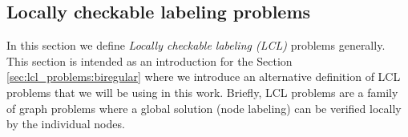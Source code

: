 
\subsection{Locally checkable labeling problems} \label{sec:lcl_problems}
In this section we define \emph{Locally checkable labeling (LCL)} problems generally.
This section is intended as an introduction for the Section \ref{sec:lcl_problems:biregular} where we introduce an alternative definition of LCL problems that we will be using in this work.
Briefly, LCL problems are a family of graph problems where a global solution (node labeling) can be verified locally by the individual nodes.



\newcommand{\Sigmain}{\Sigma_{\text{in}}}
\newcommand{\Sigmaout}{\Sigma_{\text{out}}}


